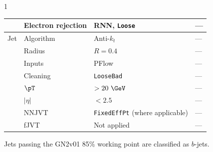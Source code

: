 \begin{table}[!htbp]
\begin{spacing}{1}
\begin{tabular}{@{}>{\raggedright\arraybackslash}p{}>{\raggedright\arraybackslash}p{}>{\raggedright\arraybackslash}p{}>{\raggedright\arraybackslash}p{}@{}}
        & Electron rejection & RNN, \texttt{Loose} & --- \\
        \midrule
        Jet & Algorithm & Anti-$k_t$ & --- \\
        & Radius & $R=0.4$ & --- \\
        & Inputs & PFlow & --- \\
        & Cleaning & \texttt{LooseBad} & --- \\
        & $\pT$ & $>20~\GeV$ & --- \\
        & $|\eta|$ & $<2.5$ & --- \\
        & NNJVT & \texttt{FixedEffPt} (where applicable) & --- \\
        & fJVT & Not applied & --- \\
        \bottomrule
    \end{tabular}
    \par\smallskip
    \raggedright Jets passing the GN2v01 85\% working point are classified as $b$-jets.
    \end{spacing}
\end{table}
